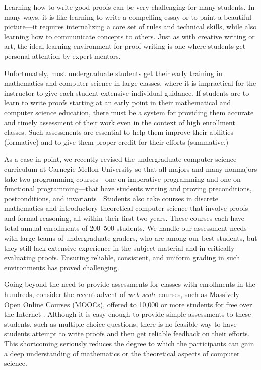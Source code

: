 \documentclass[12pt]{article}
\begin{document}
Learning how to write good proofs can be very challenging for many
students.  In many ways, it is like learning to write a compelling
essay or to paint a beautiful picture---it requires internalizing a
core set of rules and technical skills, while also learning how to
communicate concepts to others.  Just as with creative writing or art,
the ideal learning environment for proof writing is one where
students get personal attention by expert mentors.

Unfortunately, most undergraduate students get their early training in
mathematics and computer science in large classes, where it is
impractical for the instructor to give each student extensive
individual guidance.  If students are to learn to write proofs
starting at an early point in their mathematical and computer science
education, there must be a system for providing them accurate and
timely assessment of their work even in the context of high enrollment
classes.  Such assessments are essential to help them improve their
abilities (formative) and to give them proper credit for their efforts
(summative.)

As a case in point, we recently revised the undergraduate computer science
curriculum at Carnegie Mellon University so that all majors and many
nonmajors take two programming courses---one on imperative programming
and one on functional programming---that have students writing and
proving preconditions, postconditions, and invariants
\citep{bryant-ugrad10}.  Students also take courses in
discrete mathematics and introductory theoretical computer science
that involve proofs and formal reasoning, all within their first two years.
These courses each have
total annual enrollments of 200--500 students.  We handle our
assessment needs with large teams of undergraduate graders, who are
among our best students, but they still lack extensive experience in
the subject material and in critically evaluating proofs.  Ensuring
reliable, consistent, and uniform grading in such environments has proved
challenging.

Going beyond the need to provide assessments for classes with
enrollments in the hundreds, consider the recent advent of {\em web-scale}
courses, such as Massively Open Online Courses (MOOCs),
 offered to 10,000 or more students for free over the Internet
\citep{carson-am12,lewin-nyt12}.
Although it is easy enough to provide simple
assessments to these students, such as multiple-choice questions, 
there is no feasible way to have students attempt to write proofs and
then get reliable feedback on their efforts.  This shortcoming
seriously reduces the degree to which the participants can gain a deep
understanding of mathematics or the theoretical aspects of computer science.
\end{document}

